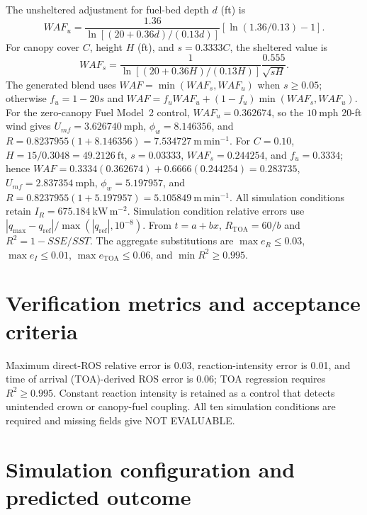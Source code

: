 The unsheltered adjustment for fuel-bed depth \(d\) (ft) is
\[
 WAF_u=\frac{1.36}{\ln[(20+0.36d)/(0.13d)]}
       \left[\ln(1.36/0.13)-1\right].
\]
For canopy cover \(C\), height \(H\) (ft), and \(s=0.3333C\), the
sheltered value is
\[
 WAF_s=\frac{1}{\ln[(20+0.36H)/(0.13H)]}
       \frac{0.555}{\sqrt{sH}}.
\]
The generated blend uses \(WAF=\min(WAF_s,WAF_u)\) when \(s\geq0.05\);
otherwise \(f_u=1-20s\) and
\(WAF=f_uWAF_u+(1-f_u)\min(WAF_s,WAF_u)\).
For the zero-canopy Fuel Model~2 control, \(WAF_u=0.362674\), so the
\(10~\mathrm{mph}\) 20-ft wind gives \(U_{mf}=3.626740~\mathrm{mph}\),
\(\phi_w=8.146356\), and
\(R=0.8237955(1+8.146356)=7.534727~\mathrm{m\,min^{-1}}\).
For \(C=0.10\), \(H=15/0.3048=49.2126~\mathrm{ft}\),
\(s=0.03333\), \(WAF_s=0.244254\), and \(f_u=0.3334\); hence
\(WAF=0.3334(0.362674)+0.6666(0.244254)=0.283735\),
\(U_{mf}=2.837354~\mathrm{mph}\), \(\phi_w=5.197957\), and
\(R=0.8237955(1+5.197957)=5.105849~\mathrm{m\,min^{-1}}\).
All simulation conditions retain \(I_R=675.184~\mathrm{kW\,m^{-2}}\).
Simulation condition relative errors use
\(|q_{\max}-q_{\mathrm{ref}}|/\max(|q_{\mathrm{ref}}|,10^{-8})\).
From \(t=a+bx\), \(R_{\mathrm{TOA}}=60/b\) and
\(R^2=1-SSE/SST\).  The aggregate substitutions are
\(\max e_R\leq0.03\), \(\max e_I\leq0.01\),
\(\max e_{\mathrm{TOA}}\leq0.06\), and \(\min R^2\geq0.995\).

\section{Verification metrics and acceptance criteria}
Maximum direct-ROS relative error is 0.03, reaction-intensity error is 0.01, and time of arrival (TOA)-derived ROS error is 0.06; TOA regression requires $R^2\ge0.995$.  Constant reaction intensity is retained as a control that detects unintended crown or canopy-fuel coupling.  All ten simulation conditions are required and missing fields give NOT EVALUABLE.

\section{Simulation configuration and predicted outcome}

